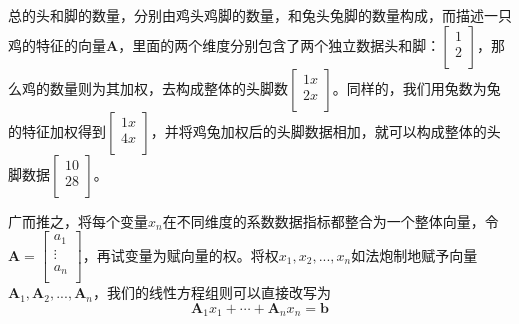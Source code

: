 \documentclass[fontset=none]{ctexart}
\begin{document}
总的头和脚的数量，分别由鸡头鸡脚的数量，和兔头兔脚的数量构成，而描述一只鸡的特征的向量$\boldsymbol{A}$，里面的两个维度分别包含了两个独立数据头和脚：$\left[ \begin{array}{c}
	1\\
	2\\
\end{array} \right]$，那么鸡的数量则为其加权，去构成整体的头脚数$\left[ \begin{array}{c}
	1x\\
	2x\\
\end{array} \right]$。同样的，我们用兔数为兔的特征加权得到$\left[ \begin{array}{c}
	1x\\
	4x\\
\end{array} \right]$，并将鸡兔加权后的头脚数据相加，就可以构成整体的头脚数据$\left[ \begin{array}{c}
	10\\
	28\\
\end{array} \right] 
$。

广而推之，将每个变量$x_n$在不同维度的系数数据指标都整合为一个整体向量，令$\boldsymbol{A}=\left[ \begin{array}{l}
	a_1\\
	\vdots\\
	a_n\\
\end{array} \right] $，再试变量为赋向量的权。将权$x_1,x_2,...,x_n$如法炮制地赋予向量$\boldsymbol{A}_1,\boldsymbol{A}_2,...,\boldsymbol{A}_n$，我们的线性方程组则可以直接改写为
$$\boldsymbol{A}_1x_1+\cdots +\boldsymbol{A}_nx_n=\boldsymbol{b}$$
\end{document}
